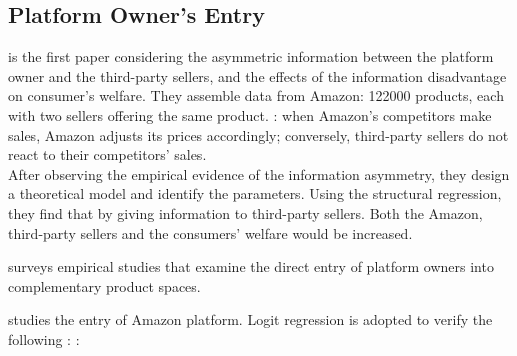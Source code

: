 \documentclass[10pt]{report}
\begin{document}
\subsection{Platform Owner's Entry}


\cite{chen2023price} is the first paper considering the asymmetric information between the platform owner and the third-party sellers, and the effects of the information disadvantage
on consumer's welfare. They assemble data from Amazon: 122000 products, each with two sellers offering the same product. : when Amazon’s competitors make sales,
Amazon adjusts its prices accordingly; conversely, third-party sellers do not react to their competitors’ sales.\\
After observing the empirical evidence of the information asymmetry, they design a theoretical model and identify the parameters. Using the structural regression, they find that by giving
information to third-party sellers. Both the Amazon, third-party sellers and the consumers' welfare would be increased.

\cite{zhu2018competing} surveys empirical studies that examine the direct entry of platform owners
into complementary product spaces.

\cite{zhu2018competing} studies the entry of Amazon platform. Logit regression is adopted to verify the following :
:
\end{document}

